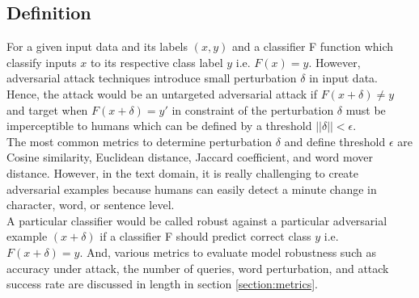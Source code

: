 \documentclass[%
	BCOR=8mm, %
	DIV=12,
	toc=bibliography, %
	toc=listof, %
	oneside, %
	egregdoesnotlikesansseriftitles, %
	]{scrbook}
\begin{document}
\subsection{Definition}
\label{subsection:definition}
For a given input data and its labels $(x, y)$ and a classifier F function which classify inputs $x$ to its respective class label $y$ i.e. $F (x) = y$. However, adversarial attack techniques introduce small perturbation $\delta$ in input data.\\
Hence, the attack would be an untargeted adversarial attack if $F(x+\delta)\not=y$ and target when $F(x+\delta)=y'$ in constraint of the perturbation $\delta$ must be imperceptible to humans which can be defined by a threshold  $||\delta||<\epsilon$. \\
The most common metrics to determine perturbation $\delta$ and define threshold $\epsilon$ are Cosine similarity, Euclidean distance, Jaccard coefficient, and word mover distance.  However, in the text domain, it is really challenging to create adversarial examples because humans can easily detect a minute change in character, word, or sentence level.\\
A particular classifier would be called robust against a particular adversarial example  $(x+\delta)$ if a classifier F should predict correct class $y$  i.e.  $F(x+\delta)=y$. And, various metrics to evaluate model robustness such as accuracy under attack,  the number of queries, word perturbation, and  attack success rate  are discussed in length in section \ref{section:metrics}.
\end{document}
